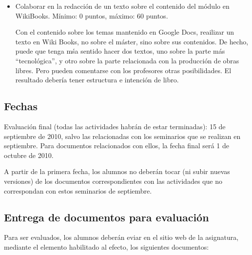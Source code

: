 \documentclass[a4paper,12pt]{article}
\begin{document}
\begin{itemize}
\item Colaborar en la redacción de un texto sobre el contenido del módulo en WikiBooks. Mínimo: 0 puntos, máximo: 60 puntos.

Con el contenido sobre los temas mantenido en Google Docs, reailizar un texto en Wiki Books, no sobre el máster, sino sobre sus contenidos. De hecho, puede que tenga mśa sentido hacer dos textos, uno sobre la parte más ``tecnológica'', y otro sobre la parte relacionada con la producción de obras libres. Pero pueden comentarse con los profesores otras posibilidades. El resultado debería tener estructura e intención de libro.

\end{itemize}

\subsection{Fechas}

Evaluación final (todas las actividades habrán de estar terminadas): 15 de septiembre de 2010, salvo las relacionadas con los seminarios que se realizan en septiembre. Para documentos relacionados con ellos, la fecha final será 1 de octubre de 2010.

A partir de la primera fecha, los alumnos no deberán tocar (ni subir nuevas versiones) de los documentos correspondientes con las actividades que no correspondan con estos seminarios de septiembre.

\subsection{Entrega de documentos para evaluación}

Para ser evaluados, los alumnos deberán eviar en el sitio web de la asignatura, mediante el elemento habilitado al efecto, los siguientes documentos:
\end{document}
